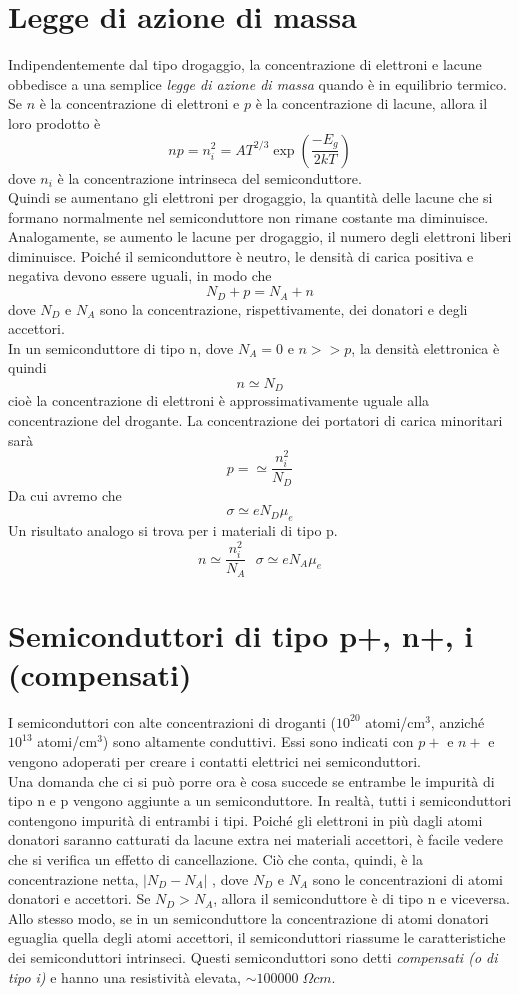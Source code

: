 \documentclass[12pt, letterpaper]{book}
\begin{document}
\section{Legge di azione di massa}
Indipendentemente dal tipo drogaggio, la concentrazione di elettroni e lacune obbedisce a una semplice \textit{legge di azione di massa} quando è in equilibrio termico. Se $n$ è la concentrazione di elettroni e $p$ è la concentrazione di lacune, allora il loro prodotto è
$$np=n_i^2=AT^{2/3}\exp\left({\frac{-E_g}{2kT}}\right)$$
dove $n_i$ è la concentrazione intrinseca del semiconduttore.\\
Quindi se aumentano gli elettroni per drogaggio, la quantità delle lacune che si formano normalmente nel semiconduttore non rimane costante ma diminuisce. Analogamente, se aumento le lacune per drogaggio, il numero degli elettroni liberi diminuisce.
Poiché il semiconduttore è neutro, le densità di carica positiva e negativa devono essere uguali, in modo che
$$N_D+p=N_A+n$$
dove $N_D$ e $N_A$ sono la concentrazione, rispettivamente, dei donatori e degli accettori.\\
In un semiconduttore di tipo n, dove $N_A=0$ e $n>>p$, la densità elettronica è quindi
$$n\simeq N_D$$
cioè la concentrazione di elettroni è approssimativamente uguale alla concentrazione del drogante. La concentrazione dei portatori di carica minoritari sarà
$$p=\simeq \frac{n_i^2}{N_D}$$
Da cui avremo che
$$\sigma\simeq eN_D\mu_e$$
Un risultato analogo si trova per i materiali di tipo p.
$$n\simeq\frac{n_i^2}{N_A}~~~\sigma\simeq eN_A\mu_e$$

\section{Semiconduttori di tipo p+, n+, i (compensati)}
I semiconduttori con alte concentrazioni di droganti ($10^{20}$ atomi/cm$^3$, anziché $10^{13}$ atomi/cm$^3$) sono altamente conduttivi. Essi sono indicati con $p+$ e $n+$ e vengono adoperati per creare i contatti elettrici nei semiconduttori.\\
Una domanda che ci si può porre ora è cosa succede se entrambe le impurità di tipo n e p vengono aggiunte a un semiconduttore. In realtà, tutti i semiconduttori contengono impurità di entrambi i tipi. Poiché gli elettroni in più dagli atomi donatori saranno catturati da lacune extra nei materiali accettori, è facile vedere che si verifica un effetto di cancellazione. Ciò che conta, quindi, è la concentrazione netta, $|N_D-N_A|$ , dove $N_D$ e $N_A$ sono le concentrazioni di atomi donatori e accettori. Se $N_D>N_A$, allora il semiconduttore è di tipo n e viceversa. Allo stesso modo, se in un semiconduttore la concentrazione di atomi donatori eguaglia quella degli atomi accettori, il semiconduttori riassume le caratteristiche dei semiconduttori intrinseci.
Questi semiconduttori sono detti \textit{compensati (o di tipo i)} e hanno una resistività elevata, $\sim 100000 \; \Omega cm$.
\end{document}
